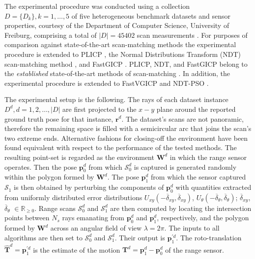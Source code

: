 The experimental procedure was conducted using a collection $D = \{D_k\}, k =
1,\dots,5$ of five heterogeneous benchmark datasets and sensor properties,
courtesy of the Department of Computer Science, University of Freiburg,
comprising a total of $|D| = 45402$ scan measurements \cite{datasets_link}.
For purposes of comparison against state-of-the-art scan-matching methods the
experimental procedure is extended to PLICP \cite{Censi2008b}, the Normal
Distributions Transform (NDT) scan-matching method \cite{Biber}, and FastGICP
\cite{Segal2009}. PLICP, NDT, and FastGICP belong to the \textit{established}
state-of-the-art methods of scan-matching
\cite{Koide2021,Xu2018a,Sobreira2019a,Pishehvari2019a,Qingshan2019a,Pham2021a}.
In addition, the experimental procedure is extended to FastVGICP
\cite{Pham2021a} and NDT-PSO \cite{Bouraine2020}.

The experimental setup is the following. The rays of each dataset instance
$D^d, d = 1,2,\dots,|D|$ are first projected to the $x-y$ plane around the
reported ground truth pose for that instance, $\bm{r}^d$.  The dataset's scans
are not panoramic, therefore the remaining space is filled with a semicircular
arc that joins the scan's two extreme ends.  Alternative fashions for
closing-off the environment have been found equivalent with respect to the
performance of the tested methods. The resulting point-set is regarded as the
environment $\bm{W}^d$ in which the range sensor operates.  Then the pose
$\bm{p}_0^d$ from which $\mathcal{S}_0^d$ is captured is generated randomly
within the polygon formed by $\bm{W}^d$. The pose $\bm{p}_1^d$ from which the
sensor captured $\mathcal{S}_1$ is then obtained by perturbing the components
of $\bm{p}_0^d$ with quantities extracted from uniformly distributed error
distributions $U_{xy}(-\overline{\delta}_{xy}, \overline{\delta}_{xy})$,
$U_{\theta}(-\overline{\delta}_{\theta}, \overline{\delta}_{\theta})$;
$\overline{\delta}_{xy}$, $\overline{\delta}_\theta$ $\in \mathbb{R}_{\geq 0}$.
Range scans $\mathcal{S}_0^d$ and $\mathcal{S}_1^d$ are then computed by
locating the intersection points between $N_s$ rays emanating from $\bm{p}_0^d$
and $\bm{p}_1^d$, respectively, and the polygon formed by $\bm{W}^d$ across an
angular field of view $\lambda = 2\pi$. The inputs to all algorithms are then
set to $\mathcal{S}_0^d$ and $\mathcal{S}_1^d$. Their output is
$\bm{p}_1^{\prime d}$. The roto-translation $\hat{\bm{T}}^d = \bm{p}_1^{\prime
d}$ is the estimate of the motion $\bm{T}^d = \bm{p}_1^d - \bm{p}_0^d$ of the
range sensor.

